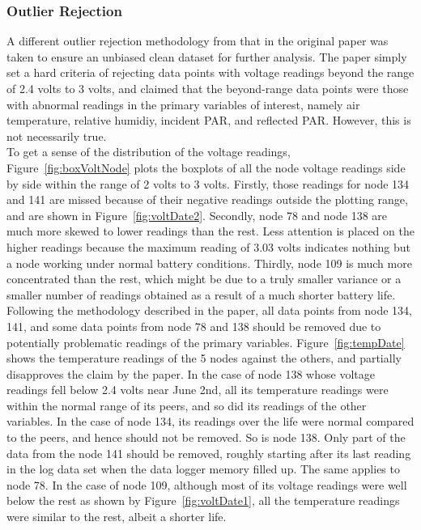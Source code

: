 \documentclass[11pt]{article}
\begin{document}
\subsubsection{Outlier Rejection}
A different outlier rejection methodology from that in the original paper was taken to ensure an unbiased clean dataset for further analysis. The paper simply set a hard criteria of rejecting data points with voltage readings beyond the range of 2.4 volts to 3 volts, and claimed that the beyond-range data points were those with abnormal readings in the primary variables of interest, namely air temperature, relative humidiy, incident PAR, and reflected PAR. However, this is not necessarily true. \\
To get a sense of the distribution of the voltage readings, Figure~\ref{fig:boxVoltNode} plots the boxplots of all the node voltage readings side by side within the range of 2 volts to 3 volts. Firstly, those readings for node 134 and 141 are missed because of their negative readings outside the plotting range, and are shown in Figure~\ref{fig:voltDate2}. Secondly, node 78 and node 138 are much more skewed to lower readings than the rest. Less attention is placed on the higher readings because the maximum reading of 3.03 volts indicates nothing but a node working under normal battery conditions. Thirdly, node 109 is much more concentrated than the rest, which might be due to a truly smaller variance or a smaller number of readings obtained as a result of a much shorter battery life. \\
Following the methodology described in the paper, all data points from node 134, 141, and some data points from node 78 and 138 should be removed due to potentially problematic readings of the primary variables. Figure~\ref{fig:tempDate} shows the temperature readings of the 5 nodes against the others, and partially disapproves the claim by the paper. In the case of node 138 whose voltage readings fell below 2.4 volts near June 2nd, all its temperature readings were within the normal range of its peers, and so did its readings of the other variables. In the case of node 134, its readings over the life were normal compared to the peers, and hence should not be removed. So is node 138. Only part of the data from the node 141 should be removed, roughly starting after its last reading in the log data set when the data logger memory filled up. The same applies to node 78. In the case of node 109, although most of its voltage readings were well below the rest as shown by Figure~\ref{fig:voltDate1}, all the temperature readings were similar to the rest, albeit a shorter life.
\end{document}
